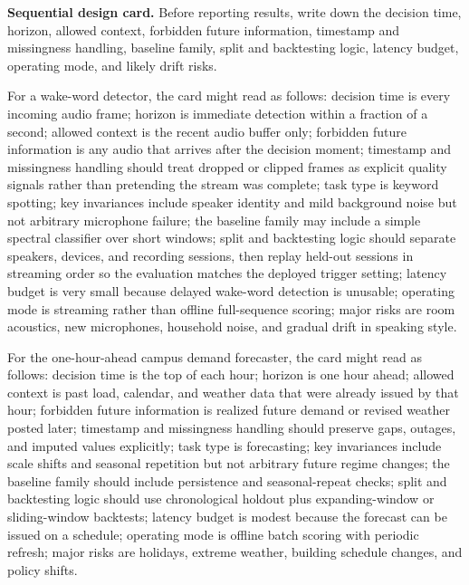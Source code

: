 \begin{thinkingtool}
\textbf{Sequential design card.} Before reporting results, write down the decision time, horizon, allowed context, forbidden future information, timestamp and missingness handling, baseline family, split and backtesting logic, latency budget, operating mode, and likely drift risks.
\end{thinkingtool}

\begin{example}
For a wake-word detector, the card might read as follows: decision time is every incoming audio frame; horizon is immediate detection within a fraction of a second; allowed context is the recent audio buffer only; forbidden future information is any audio that arrives after the decision moment; timestamp and missingness handling should treat dropped or clipped frames as explicit quality signals rather than pretending the stream was complete; task type is keyword spotting; key invariances include speaker identity and mild background noise but not arbitrary microphone failure; the baseline family may include a simple spectral classifier over short windows; split and backtesting logic should separate speakers, devices, and recording sessions, then replay held-out sessions in streaming order so the evaluation matches the deployed trigger setting; latency budget is very small because delayed wake-word detection is unusable; operating mode is streaming rather than offline full-sequence scoring; major risks are room acoustics, new microphones, household noise, and gradual drift in speaking style.
\end{example}

\begin{example}
For the one-hour-ahead campus demand forecaster, the card might read as follows: decision time is the top of each hour; horizon is one hour ahead; allowed context is past load, calendar, and weather data that were already issued by that hour; forbidden future information is realized future demand or revised weather posted later; timestamp and missingness handling should preserve gaps, outages, and imputed values explicitly; task type is forecasting; key invariances include scale shifts and seasonal repetition but not arbitrary future regime changes; the baseline family should include persistence and seasonal-repeat checks; split and backtesting logic should use chronological holdout plus expanding-window or sliding-window backtests; latency budget is modest because the forecast can be issued on a schedule; operating mode is offline batch scoring with periodic refresh; major risks are holidays, extreme weather, building schedule changes, and policy shifts.
\end{example}

